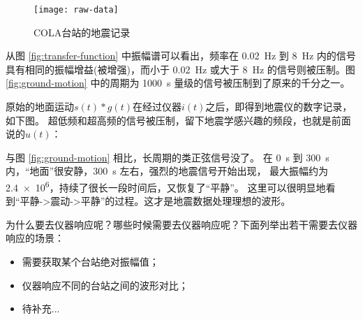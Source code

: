 \begin{figure}[H]
\centering
\texttt{[image: raw-data]}
\caption{COLA台站的地震记录}
\end{figure}

从图 \ref{fig:transfer-function} 中振幅谱可以看出，频率在 \SI{0.02}{\Hz}
到 \SI{8}{\Hz} 内的信号具有相同的振幅增益(被增强)，而小于 \SI{0.02}{\Hz}
或大于 \SI{8}{\Hz} 的信号则被压制。图 \ref{fig:ground-motion} 中的周期为
\SI{1000}{\s} 量级的信号被压制到了原来的千分之一。

原始的地面运动$s(t)*g(t)$在经过仪器$i(t)$之后，即得到地震仪的数字记录，如下图。
超低频和超高频的信号被压制，留下地震学感兴趣的频段，也就是前面说的$u(t)$：

与图 \ref{fig:ground-motion} 相比，长周期的类正弦信号没了。
在 \SI{0}{\s} 到 \SI{300}{\s} 内，``地面''很安静，\SI{300}{\s} 左右，强烈的地震信号开始出现，
最大振幅约为 \num{2.4e6}，持续了很长一段时间后，又恢复了``平静''。
这里可以很明显地看到``平静->震动->平静''的过程。这才是地震数据处理理想的波形。

为什么要去仪器响应呢？哪些时候需要去仪器响应呢？下面列举出若干需要去仪器响应的场景：
\begin{itemize}
\item 需要获取某个台站绝对振幅值；
\item 仪器响应不同的台站之间的波形对比；
\item 待补充...
\end{itemize}
